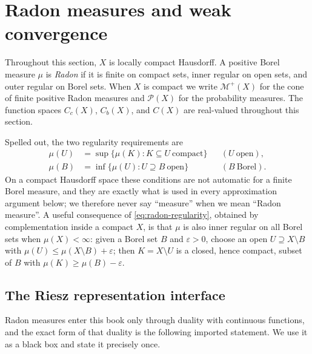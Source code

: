 \section{Radon measures and weak convergence}
\label{sec:radon-weak}

Throughout this section, $X$ is locally compact Hausdorff.  A positive Borel
measure $\mu$ is \emph{Radon} if it is finite on compact sets, inner regular
on open sets, and outer regular on Borel sets.  When $X$ is compact we write
$\mathcal M^+(X)$ for the cone of finite positive Radon measures and
$\mathcal P(X)$ for the probability measures.  The function spaces
$C_c(X)$, $C_b(X)$, and $C(X)$ are real-valued throughout this section.

Spelled out, the two regularity requirements are
\begin{equation}
\label{eq:radon-regularity}
\begin{aligned}
 \mu(U)&=\sup\{\mu(K):K\subseteq U\ \text{compact}\}
 &&(U\ \text{open}),\\
 \mu(B)&=\inf\{\mu(U):U\supseteq B\ \text{open}\}
 &&(B\ \text{Borel}).
\end{aligned}
\end{equation}
On a compact Hausdorff space these conditions are not automatic for a finite
Borel measure, and they are exactly what is used in every approximation
argument below; we therefore never say ``measure'' when we mean ``Radon
measure''.  A useful consequence of \eqref{eq:radon-regularity}, obtained by
complementation inside a compact $X$, is that $\mu$ is also inner regular on
all Borel sets when $\mu(X)<\infty$: given a Borel set $B$ and
$\varepsilon>0$, choose an open $U\supseteq X\setminus B$ with
$\mu(U)\leq\mu(X\setminus B)+\varepsilon$; then $K=X\setminus U$ is a closed,
hence compact, subset of $B$ with $\mu(K)\geq\mu(B)-\varepsilon$.

\subsection{The Riesz representation interface}

Radon measures enter this book only through duality with continuous functions,
and the exact form of that duality is the following imported statement.  We
use it as a black box and state it precisely once.

